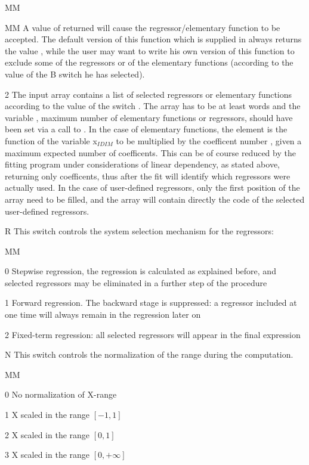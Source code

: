 \begin{DLtt}{MM}
\begin{DLtt}{MM}
A value of  returned will cause the regressor/elementary function
to be accepted.
The default version of this function which is supplied in 
always returns the value , while the user may want to write
his own version of this function to exclude some of the regressors or of the
elementary functions (according to the value of the B switch he has selected).
\item[2] The input array  contains a list of
selected regressors
or elementary functions according to the value of the switch .
The array has to
be at least  words and the variable ,
maximum number of elementary functions or regressors, should have
been set via a call to .
In the case of elementary functions, the element
 is the function of the variable x$_{IDIM}$
to be multiplied by the coefficent number ,
given a maximum expected number of  coefficents.
This can be of course reduced by the fitting
program under considerations of linear dependency, as stated above,
returning only  coefficents, thus after the fit
 will identify which regressors were actually used.
In the case of user-defined
regressors, only the first  position of the 
array need to be filled, and the array will contain directly the code
of the selected user-defined regressors.
\end{DLtt}
\item[R] This switch controls the system selection mechanism
for the regressors:
\begin{DLtt}{MM}
\item[0] Stepwise regression, the regression is calculated as
explained before, and selected regressors may be eliminated in a further
step of the procedure
\item[1] Forward regression. The backward stage is suppressed: a regressor
included at one time will always remain in the regression later on
\item[2] Fixed-term regression: all selected regressors
will appear in the final expression
\end{DLtt}
\item[N] This switch controls the normalization of the 
range during the computation.
\begin{DLtt}{MM}
\item[0] No normalization of X-range
\item[1] X scaled in the range $[-1,1]$
\item[2] X scaled in the range $[0,1]$
\item[3] X scaled in the range $[0,+\infty]$
\end{DLtt}
\end{DLtt}
 
